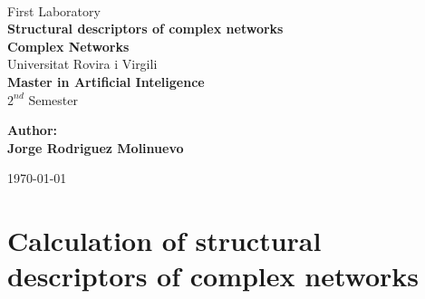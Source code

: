 \documentclass[12pt,a4paper,oneside]{article}
\date{\today}
\numberwithin{equation}{section}
\numberwithin{equation}{section}
\theoremstyle{definition}
\begin{document}
\begin{center}
	\textbf{ }\\[4cm]
	
	\LARGE First Laboratory\\[0.5cm]
	\textbf{{\Huge Structural descriptors of complex networks}}\\[0.5cm]
	\textbf{{\LARGE Complex Networks}}\\[1.5cm]
	
	{\Large Universitat Rovira i Virgili}\\[2.3cm]
	{\LARGE \textbf{Master in Artificial Inteligence}}\\[0.5cm]
	{\LARGE $2^{nd}$ Semester}\\[2.5cm]
	
	\begin{flushright}
		\textbf{\large{Author:}\\ \normalsize{Jorge Rodriguez Molinuevo\\}}
	\end{flushright}
	\today
\end{center}
\thispagestyle{empty} 

\pagebreak

\section{Calculation of structural descriptors of complex networks}
\end{document}
